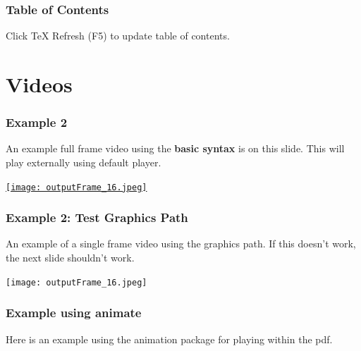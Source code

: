 \documentclass{beamer}
\begin{document}
% 
% 
% 


\begin{frame}
  \frametitle{Table of Contents}
  \tableofcontents
  Click TeX Refresh (F5) to update table of contents.
\end{frame}

\section{Videos}

\begin{frame}
    \frametitle{Example 2}
    
    An example full frame video using the \textbf{basic syntax} is on this slide. This will play externally using default player.
    
    \vspace{20pt}
    
    \href{run:apollo17.avi}{\texttt{[image: outputFrame\_16.jpeg]}}
\end{frame}

\begin{frame}
    \frametitle{Example 2: Test Graphics Path}
    
    An example of a single frame video using the graphics path.
    If this doesn't work, the next slide shouldn't work.
    
    \vspace{20pt}
    
    \texttt{[image: outputFrame\_16.jpeg]}
\end{frame}



\begin{frame}

\frametitle{Example using animate}
Here is an example using the animation package for playing within the pdf.
\begin{figure}
\end{figure}
\end{frame}


%     
% 
%     
% 
% 
%     
% 
% 
%     
\end{document}
